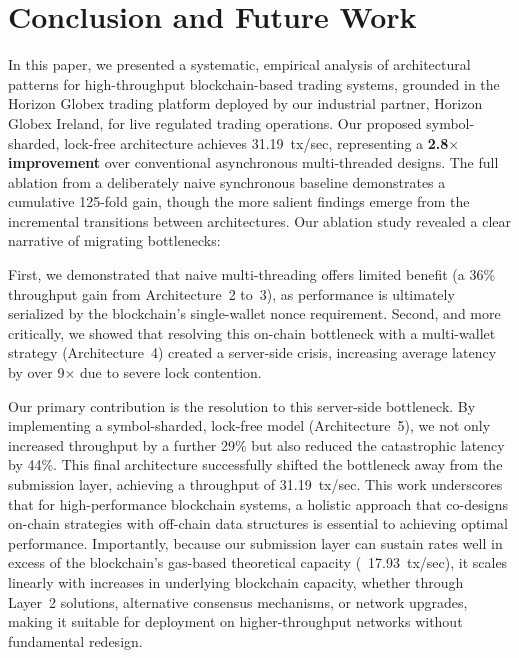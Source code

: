 \section{Conclusion and Future Work}
\label{sec:conclusion}

In this paper, we presented a systematic, empirical analysis of architectural patterns for high-throughput blockchain-based trading systems, grounded in the Horizon Globex trading platform deployed by our industrial partner, Horizon Globex Ireland, for live regulated trading operations. Our proposed symbol-sharded, lock-free architecture achieves 31.19~tx/sec, representing a \textbf{2.8$\times$ improvement} over conventional asynchronous multi-threaded designs. The full ablation from a deliberately naive synchronous baseline demonstrates a cumulative 125-fold gain, though the more salient findings emerge from the incremental transitions between architectures. Our ablation study revealed a clear narrative of migrating bottlenecks:

First, we demonstrated that naive multi-threading offers limited benefit (a 36\% throughput gain from Architecture~2 to~3), as performance is ultimately serialized by the blockchain's single-wallet nonce requirement. Second, and more critically, we showed that resolving this on-chain bottleneck with a multi-wallet strategy (Architecture~4) created a server-side crisis, increasing average latency by over 9$\times$ due to severe lock contention.

Our primary contribution is the resolution to this server-side bottleneck. By implementing a symbol-sharded, lock-free model (Architecture~5), we not only increased throughput by a further 29\% but also reduced the catastrophic latency by 44\%. This final architecture successfully shifted the bottleneck away from the submission layer, achieving a throughput of 31.19~tx/sec. This work underscores that for high-performance blockchain systems, a holistic approach that co-designs on-chain strategies with off-chain data structures is essential to achieving optimal performance. Importantly, because our submission layer can sustain rates well in excess of the blockchain's gas-based theoretical capacity (~17.93~tx/sec), it scales linearly with increases in underlying blockchain capacity, whether through Layer~2 solutions, alternative consensus mechanisms, or network upgrades, making it suitable for deployment on higher-throughput networks without fundamental redesign.

